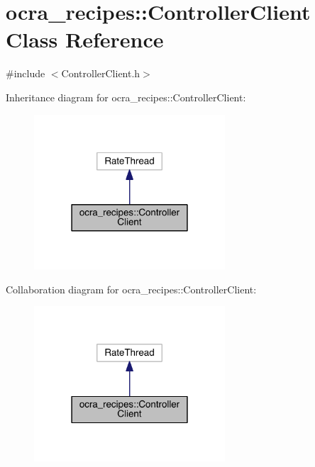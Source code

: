 \hypertarget{classocra__recipes_1_1ControllerClient}{}\section{ocra\+\_\+recipes\+:\+:Controller\+Client Class Reference}
\label{classocra__recipes_1_1ControllerClient}


{\ttfamily \#include $<$Controller\+Client.\+h$>$}



Inheritance diagram for ocra\+\_\+recipes\+:\+:Controller\+Client\+:\nopagebreak
\begin{figure}[H]
\begin{center}
\leavevmode
\includegraphics[width=202pt]{db/d0d/classocra__recipes_1_1ControllerClient__inherit__graph}
\end{center}
\end{figure}


Collaboration diagram for ocra\+\_\+recipes\+:\+:Controller\+Client\+:\nopagebreak
\begin{figure}[H]
\begin{center}
\leavevmode
\includegraphics[width=202pt]{db/d24/classocra__recipes_1_1ControllerClient__coll__graph}
\end{center}
\end{figure}
